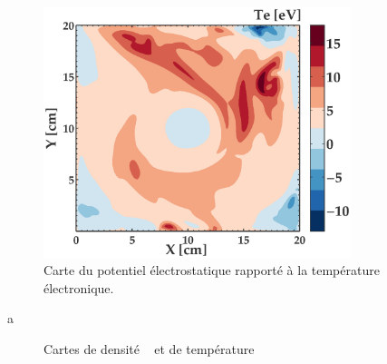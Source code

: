 \begin{refsection}
\begin{figure}[htbp]
\centering
\includegraphics[width=0.8\textwidth]{figures/4-CybeleCartePhiSurTeBase.eps}
{\caption{Carte du potentiel électrostatique rapporté à la température
électronique.}
\label{4-CybeleCartePhiSurTeBase}}
\end{figure}

a

\begin{figure}[htbp]
  \centering
    \caption{Cartes de densité ~ et de
    température }
    \label{pandas}
\end{figure}


\end{refsection}

